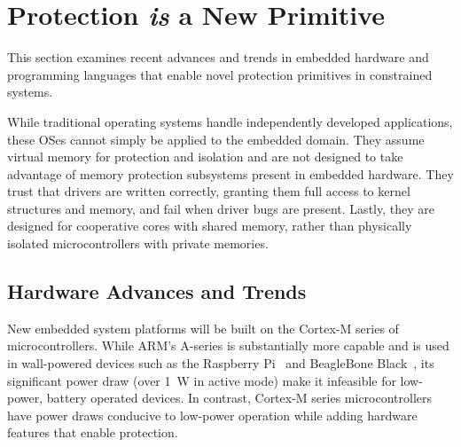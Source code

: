 \section{Protection \emph{is} a New Primitive}
\label{protection}


%
This section examines recent advances and trends in embedded hardware and
programming languages that enable novel protection primitives in constrained
systems.

While traditional operating systems handle independently developed applications,
these OSes cannot simply be applied to the embedded domain. They assume virtual memory
for protection and isolation and are not designed to take advantage of memory protection subsystems
present in embedded hardware. They trust that drivers are written correctly,
granting them full access to kernel structures and memory, and fail when driver bugs
are present. Lastly, they are designed for cooperative cores with shared memory,
rather than physically isolated microcontrollers with private memories.


\subsection{Hardware Advances and Trends}

New embedded system platforms will be built on the Cortex-M series of microcontrollers.
While ARM's A-series is substantially more capable and is used in wall-powered
devices such as the Raspberry Pi~\cite{rpi} and BeagleBone Black~\cite{bbb},
its significant power draw (over 1~W in active mode) make it infeasible for
low-power, battery operated devices.
In contrast, Cortex-M series microcontrollers have power draws conducive to
low-power operation while adding hardware features that enable protection.




